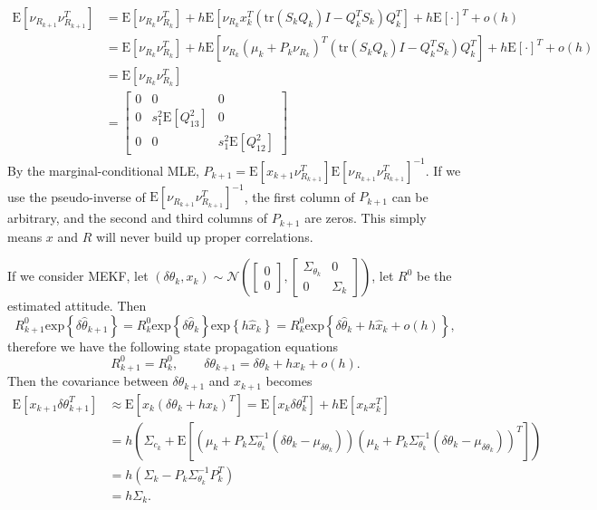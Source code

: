 \documentclass[10pt]{article}
\newcommand{\tr}[1]{\ensuremath{\mathrm{tr}\left( #1 \right)}}
\newcommand{\expect}[1]{\ensuremath{\mathrm{E}\left[ #1 \right]}}
\newcommand{\expb}[1]{\ensuremath{\mathrm{exp}\left\{#1\right\}}}
\begin{document}
\begin{align*}
	\expect{\nu_{R_{k+1}}\nu_{R_{k+1}}^T} &= \expect{\nu_{R_k}\nu_{R_k}^T} + h\expect{\nu_{R_k}x_k^T(\tr{S_kQ_k}I-Q_k^TS_k)Q_k^T} + h\expect{\cdot}^T + o(h) \\
	&= \expect{\nu_{R_k}\nu_{R_k}^T} + h\expect{\nu_{R_k}(\mu_k+P_k\nu_{R_k})^T(\tr{S_kQ_k}I-Q_k^TS_k)Q_k^T} + h\expect{\cdot}^T + o(h) \\
	&= \expect{\nu_{R_k}\nu_{R_k}^T} \\
	&= \begin{bmatrix} 0 & 0 & 0 \\ 0 & s_1^2\expect{Q_{13}^2} & 0 \\ 0 & 0 & s_1^2\expect{Q_{12}^2} \end{bmatrix}
\end{align*}
By the marginal-conditional MLE, $P_{k+1} = \expect{x_{k+1}\nu_{R_{k+1}}^T}\expect{\nu_{R_{k+1}}\nu_{R_{k+1}}^T}^{-1}$.
If we use the pseudo-inverse of $\expect{\nu_{R_{k+1}}\nu_{R_{k+1}}^T}^{-1}$, the first column of $P_{k+1}$ can be arbitrary, and the second and third columns of $P_{k+1}$ are zeros.
This simply means $x$ and $R$ will never build up proper correlations.

If we consider MEKF, let $(\delta\theta_k,x_k) \sim \mathcal{N}\left( \begin{bmatrix} 0 \\ 0\end{bmatrix}, \begin{bmatrix} \Sigma_{\theta_k} & 0 \\ 0 & \Sigma_k \end{bmatrix} \right)$, let $R^0$ be the estimated attitude.
Then
\begin{equation*}
	R^0_{k+1}\expb{\delta\hat{\theta}_{k+1}} = R^0_k\expb{\delta\hat{\theta}_k}\expb{h\hat{x}_k} = R_k^0\expb{\delta\hat{\theta}_k+h\hat{x}_k + o(h)},
\end{equation*} 
therefore we have the following state propagation equations
\begin{equation*}
	R^0_{k+1} = R^0_k, \qquad \delta\theta_{k+1} = \delta\theta_k + hx_k + o(h).
\end{equation*}
Then the covariance between $\delta\theta_{k+1}$ and $x_{k+1}$ becomes
\begin{align*}
	\expect{x_{k+1}\delta\theta_{k+1}^T} &\approx \expect{x_k(\delta\theta_k + hx_k)^T} = \expect{x_k\delta\theta_k^T} + h\expect{x_kx_k^T} \\
	&= h\left( \Sigma_{c_k}+\expect{\left(\mu_k+P_k\Sigma_{\theta_k}^{-1}(\delta\theta_k-\mu_{\delta\theta_k})\right) \left(\mu_k+P_k\Sigma_{\theta_k}^{-1}(\delta\theta_k-\mu_{\delta\theta_k})\right)^T} \right) \\
	&= h(\Sigma_k - P_k\Sigma_{\theta_k}^{-1}P_k^T) \\
	&= h\Sigma_k.
\end{align*}
\end{document}
